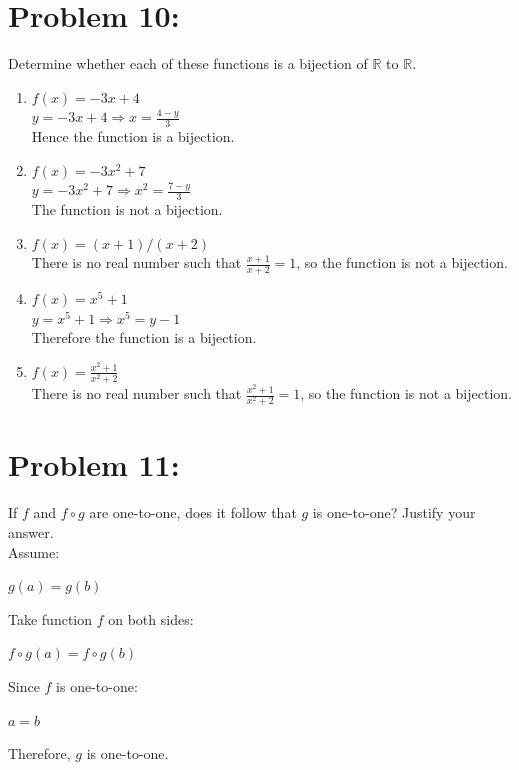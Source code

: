 \documentclass[12pt,en,a4paper]{article}
\begin{document}
	\section*{Problem 10:}
	Determine whether each of these functions is a bijection of $\mathbb{R}$ to $\mathbb{R}$.
	\begin{enumerate}
		\item $f(x) = -3x+4$\\
		$y=-3x+4 \Rightarrow x=\frac{4-y}{3}$\\
		Hence the function is a bijection.
		\item $f(x) = -3x^2 +7$\\
		$y=-3x^2 +7 \Rightarrow x^2=\frac{7-y}{3}$\\
		The function is not a bijection.
		\item $f(x) = (x+1)/(x+2)$\\
		There is no real number such that $\frac{x+1}{x+2} =1$, so the function is not a bijection.
		\item $f(x) = x^5 +1$\\
		$y=x^5 +1 \Rightarrow x^5 =y-1$\\
		Therefore the function is a bijection.
		\item $f(x) = \frac{x^2 +1}{x^2 +2}$\\
		There is no real number such that $\frac{x^2+1}{x^2+2}=1$, so the function is not a bijection.
	\end{enumerate}
\newpage
{}
	\section*{Problem 11:}
	If $f$ and $f \circ g$ are one-to-one, does it follow that $g$ is one-to-one? Justify your answer.\\
	Assume:
	\begin{center}
		$g(a)=g(b)$
	\end{center}
	Take function $f$ on both sides:
	\begin{center}
		$f \circ g(a)=f\circ g(b)$
	\end{center}
	Since $f$ is one-to-one:
	\begin{center}
		$a=b$
	\end{center}
	Therefore, $g$ is one-to-one.
\newpage
{}
\end{document}
